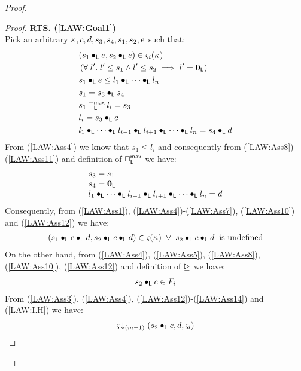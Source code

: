 \begin{lemma}[]
\begin{proof}
\begin{proof}
\noindent\textbf{RTS. (\ref{LAW:Goal1})} \\
Pick an arbitrary $\kappa_{}, c, d, s_3, s_4, s_1, s_2, e$ such that:
%
\begin{align}
	& (s_1 \bullet_{\textsf{L}} e, s_2 \bullet_{\textsf{L}} e) \in \varsigma_{i}(\kappa_{}) \label{LAW:Ass5} \\
	& \left(\forall\; l'.\; l' \leq s_1 \land l' \leq s_2 \implies l' = \mathbf{0}_{\textsf{L}}\right) \label{LAW:Ass6}\\
	& s_1 \bullet_{\textsf{L}} e \leq  l_1 \bullet_{\textsf{L}} \cdots \bullet_{\textsf{L}} l_n \label{LAW:Ass7}\\
	& s_1 = s_3 \bullet_{\textsf{L}} s_4 \label{LAW:Ass8}\\
	& s_1 \sqcap_{\textsf{L}}^{\textsf{max}} l_i = s_3 \label{LAW:Ass9}\\
	& l_i = s_3 \bullet_{\textsf{L}} c \label{LAW:Ass10}\\
	& l_1 \bullet_{\textsf{L}} \cdots \bullet_{\textsf{L}} l_{i-1} \bullet_{\textsf{L}} l_{i+1} \bullet_{\textsf{L}} \cdots \bullet_{\textsf{L}} l_n = s_4 \bullet_{\textsf{L}} d \label{LAW:Ass11}
\end{align}
From (\ref{LAW:Ass4}) we know that $s_1 \leq l_i$ and consequently from (\ref{LAW:Ass8})-(\ref{LAW:Ass11}) and definition of $\sqcap_{\textsf{L}}^{\textsf{max}}$ we have:
%
\begin{align}
\begin{array}{l}
	s_3 = s_1 \\
	s_4 = \mathbf{0}_{\textsf{L}}\\
	l_1 \bullet_{\textsf{L}} \cdots \bullet_{\textsf{L}} l_{i-1} \bullet_{\textsf{L}} l_{i+1} \bullet_{\textsf{L}} \cdots \bullet_{\textsf{L}} l_n = d
\end{array} \label{LAW:Ass12}
\end{align}
Consequently, from (\ref{LAW:Ass1}), (\ref{LAW:Ass4})-(\ref{LAW:Ass7}), (\ref{LAW:Ass10}) and (\ref{LAW:Ass12}) we have:
%
\begin{align}
	(s_1 \bullet_{\textsf{L}} c \bullet_{\textsf{L}} d, s_2 \bullet_{\textsf{L}} c \bullet_{\textsf{L}} d) \in \varsigma_{}(\kappa_{}) \;\lor\; s_2 \bullet_{\textsf{L}} c \bullet_{\textsf{L}} d \hspace*{0.2cm} \text{is undefined} \label{LAW:Ass13}
\end{align}
%
On the other hand, from (\ref{LAW:Ass4}), (\ref{LAW:Ass5}), (\ref{LAW:Ass8}), (\ref{LAW:Ass10}), (\ref{LAW:Ass12}) and definition of $\unrhd$ we have:
%
\begin{align}
	s_2 \bullet_{\textsf{L}} c \in F_i \label{LAW:Ass14}
\end{align}
From (\ref{LAW:Ass3}), (\ref{LAW:Ass4}), (\ref{LAW:Ass12})-(\ref{LAW:Ass14}) and (\ref{LAW:I.H}) we have:
%
\begin{align}
	\extendsAMUpto{\amod{}}{(m-1)}{s_2 \composeL c}{d}{\amod{i}} \label{LAW:Ass15}

\end{align}
\end{proof}
\end{proof}
\end{lemma}

